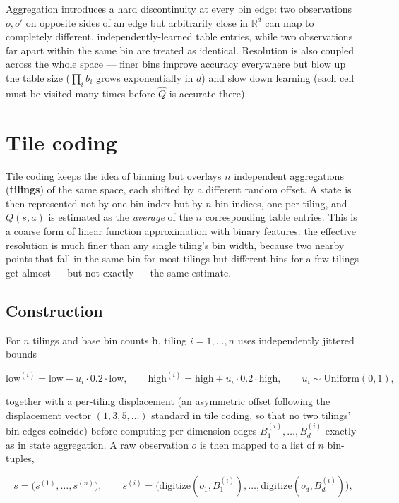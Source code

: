 \documentclass[11pt]{article}
\begin{document}
Aggregation introduces a hard discontinuity at every bin edge: two
observations $o, o'$ on opposite sides of an edge but arbitrarily close in
$\mathbb{R}^d$ can map to completely different, independently-learned
table entries, while two observations far apart within the same bin are
treated as identical. Resolution is also coupled across the whole space —
finer bins improve accuracy everywhere but blow up the table size
($\prod_i b_i$ grows exponentially in $d$) and slow down learning (each
cell must be visited many times before $\hat{Q}$ is accurate there).

\section{Tile coding}

Tile coding keeps the idea of binning but overlays $n$ independent
aggregations (\textbf{tilings}) of the same space, each shifted by a
different random offset. A state is then represented not by one bin index
but by $n$ bin indices, one per tiling, and $Q(s,a)$ is estimated as the
\emph{average} of the $n$ corresponding table entries. This is a coarse
form of linear function approximation with binary features: the effective
resolution is much finer than any single tiling's bin width, because two
nearby points that fall in the same bin for most tilings but different
bins for a few tilings get almost — but not exactly — the same estimate.

\subsection{Construction}

For $n$ tilings and base bin counts $\mathbf{b}$, tiling $i = 1, \dots, n$
uses independently jittered bounds

\[
    \text{low}^{(i)} = \text{low} - u_i \cdot 0.2 \cdot \text{low}, \qquad
    \text{high}^{(i)} = \text{high} + u_i \cdot 0.2 \cdot \text{high}, \qquad u_i \sim \mathrm{Uniform}(0,1),
\]

together with a per-tiling displacement (an asymmetric offset following the
displacement vector $(1, 3, 5, \dots)$ standard in tile coding, so that no
two tilings' bin edges coincide) before computing per-dimension edges
$B_1^{(i)}, \dots, B_d^{(i)}$ exactly as in state aggregation. A raw
observation $o$ is then mapped to a list of $n$ bin-tuples,

\[
    s = \big(s^{(1)}, \dots, s^{(n)}\big), \qquad
    s^{(i)} = \big(\mathrm{digitize}(o_1, B_1^{(i)}), \dots, \mathrm{digitize}(o_d, B_d^{(i)})\big),
\]
\end{document}
